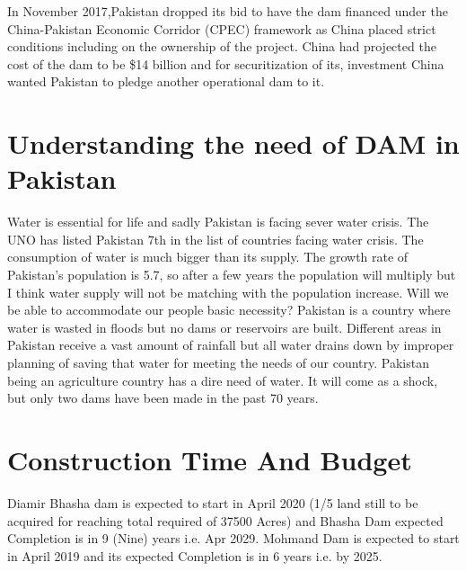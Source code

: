 \documentclass[11pt, journal,letterpaper,compsoc]{IEEEtran}
\begin{document}
In November 2017,Pakistan dropped its bid to have the dam financed under the China-Pakistan Economic Corridor (CPEC) framework as China placed strict conditions including on the ownership of the project. China had projected the cost of the dam to be \$14 billion and for
securitization of its, investment China wanted Pakistan to pledge another operational dam to it.
\hfill 


\section{Understanding the need of DAM in Pakistan}
Water is essential for life and sadly Pakistan is facing sever water crisis. The UNO has listed Pakistan 7th in the list of countries facing water crisis. The consumption of water is much bigger than its supply. The growth rate of Pakistan’s population is 5.7, so after a few years the population will multiply but I think water supply will not be matching with the population increase. Will we be able to accommodate our people basic necessity?
Pakistan is a country where water is wasted in floods but no dams or reservoirs are built. Different areas in Pakistan receive a vast amount of rainfall but all water drains down by improper planning of saving that water for meeting the needs of our country. Pakistan being an agriculture country has a dire need of water. It will come as a shock, but only two dams have been made in the past 70 years.

 
 \section{Construction Time And Budget}
Diamir Bhasha dam is expected to start in April 2020 (1/5 land still to be acquired for reaching total required of 37500 Acres) and Bhasha Dam expected Completion is in 9 (Nine) years i.e. Apr 2029.
Mohmand Dam is expected to start in April 2019 and its expected Completion is in 6 years i.e. by 2025.
\end{document}
